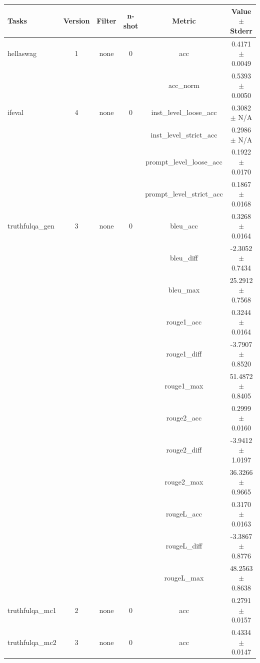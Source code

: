 \documentclass{ifacconf}
\begin{document}
	\vfill
	\clearpage
	\pagebreak
	
	\begin{strip}
		\begin{minipage}{\textwidth}
			\begin{table}[H]
				\centering
				\begin{tabular}{|l|c|c|c|c|c|}
					\hline
					\textbf{Tasks} & \textbf{Version} & \textbf{Filter} & \textbf{n-shot} & \textbf{Metric} & \textbf{Value} $\pm$ \textbf{Stderr} \\ \hline
					hellaswag & 1 & none & 0 & acc & 0.4171 $\pm$ 0.0049 \\ \hline
					& & & & acc\_norm & 0.5393 $\pm$ 0.0050 \\ \hline
					ifeval & 4 & none & 0 & inst\_level\_loose\_acc & 0.3082 $\pm$ N/A \\ \hline
					& & & & inst\_level\_strict\_acc & 0.2986 $\pm$ N/A \\ \hline
					& & & & prompt\_level\_loose\_acc & 0.1922 $\pm$ 0.0170 \\ \hline
					& & & & prompt\_level\_strict\_acc & 0.1867 $\pm$ 0.0168 \\ \hline
					truthfulqa\_gen & 3 & none & 0 & bleu\_acc & 0.3268 $\pm$ 0.0164 \\ \hline
					& & & & bleu\_diff & -2.3052 $\pm$ 0.7434 \\ \hline
					& & & & bleu\_max & 25.2912 $\pm$ 0.7568 \\ \hline
					& & & & rouge1\_acc & 0.3244 $\pm$ 0.0164 \\ \hline
					& & & & rouge1\_diff & -3.7907 $\pm$ 0.8520 \\ \hline
					& & & & rouge1\_max & 51.4872 $\pm$ 0.8405 \\ \hline
					& & & & rouge2\_acc & 0.2999 $\pm$ 0.0160 \\ \hline
					& & & & rouge2\_diff & -3.9412 $\pm$ 1.0197 \\ \hline
					& & & & rouge2\_max & 36.3266 $\pm$ 0.9665 \\ \hline
					& & & & rougeL\_acc & 0.3170 $\pm$ 0.0163 \\ \hline
					& & & & rougeL\_diff & -3.3867 $\pm$ 0.8776 \\ \hline
					& & & & rougeL\_max & 48.2563 $\pm$ 0.8638 \\ \hline
					truthfulqa\_mc1 & 2 & none & 0 & acc & 0.2791 $\pm$ 0.0157 \\ \hline
					truthfulqa\_mc2 & 3 & none & 0 & acc & 0.4334 $\pm$ 0.0147 \\ \hline
				\end{tabular}
				\label{tab:gemma2_pruned}
			\end{table}
			

\end{minipage}
\end{strip}
\end{document}

